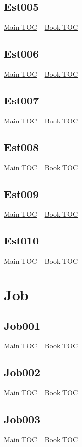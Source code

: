 \documentclass{book}
\begin{document}
  \section{Est005}\hyperlink{toc}{Main TOC} ~ \hyperref[subsec:Est]{Book TOC} 
  \section{Est006}\hyperlink{toc}{Main TOC} ~ \hyperref[subsec:Est]{Book TOC} 
  \section{Est007}\hyperlink{toc}{Main TOC} ~ \hyperref[subsec:Est]{Book TOC} 
  \section{Est008}\hyperlink{toc}{Main TOC} ~ \hyperref[subsec:Est]{Book TOC} 
  \section{Est009}\hyperlink{toc}{Main TOC} ~ \hyperref[subsec:Est]{Book TOC} 
  \section{Est010}\hyperlink{toc}{Main TOC} ~ \hyperref[subsec:Est]{Book TOC} 
  \chapter{Job} \label{subsec:Job} \begin{multicols}{2} \minitoc \end{multicols}
  \section{Job001}\hyperlink{toc}{Main TOC} ~ \hyperref[subsec:Job]{Book TOC} 
  \section{Job002}\hyperlink{toc}{Main TOC} ~ \hyperref[subsec:Job]{Book TOC} 
  \section{Job003}\hyperlink{toc}{Main TOC} ~ \hyperref[subsec:Job]{Book TOC} 
\end{document}
